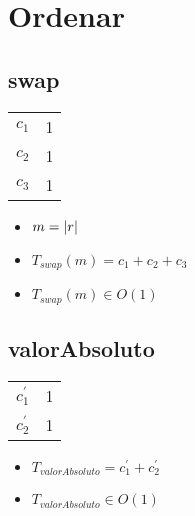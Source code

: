 \documentclass{article}
\begin{document}
    \section*{Ordenar}

    \subsection*{swap}

    \begin{minipage}{0.70\textwidth}
        
    \end{minipage}
    \hfill
    \begin{minipage}{0.25\textwidth}
        \begin{tabular}{|c|c}
            $c_1$ & 1 \\
            $c_2$ & 1 \\
            $c_3$ & 1 \\
        \end{tabular}
    \end{minipage}

    \begin{itemize}
        \item $m = |r|$
        \item $T_{swap}(m) = c_1 + c_2 + c_3 $
        \item $T_{swap}(m) \in O(1)$
    \end{itemize}

    \subsection*{valorAbsoluto}

    \begin{minipage}{0.70\textwidth}
        
    \end{minipage}
    \hfill
    \begin{minipage}{0.25\textwidth}
        \begin{tabular}{|c|c}

            $c^{\prime}_1$ & 1 \\
            $c^{\prime}_2$ & 1 \\
           
        \end{tabular}
    \end{minipage}

    \begin{itemize}
        \item $T_{valorAbsoluto} = c^{\prime}_1 + c^{\prime}_2$
        \item $T_{valorAbsoluto} \in O(1)$
    \end{itemize}
\end{document}

